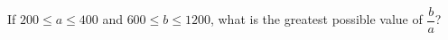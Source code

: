 If $200 \leqslant a\leqslant400$ and $600 \leqslant b\leqslant1200$, what is the greatest possible value of $\dfrac{b}{a}$?
